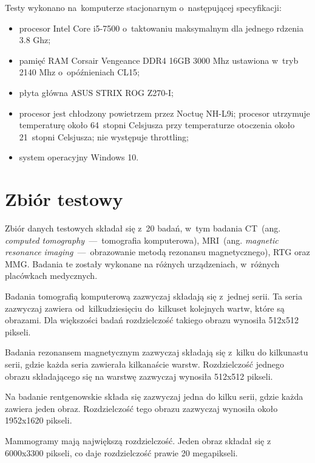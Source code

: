 \documentclass[a4paper,11pt,twoside,openright]{report}
\theoremstyle{definition}
\begin{document}
Testy wykonano na~komputerze stacjonarnym o~następującej specyfikacji:
\begin{itemize}[noitemsep]
\item procesor Intel Core i5-7500 o~taktowaniu maksymalnym dla jednego rdzenia 3.8 Ghz;
\item pamięć RAM Corsair Vengeance DDR4 16GB 3000 Mhz ustawiona w~tryb 2140 Mhz o~opóźnieniach CL15;
\item płyta główna ASUS STRIX ROG Z270-I;
\item procesor jest chłodzony powietrzem przez Noctuę NH-L9i; procesor utrzymuje
temperaturę około 64~stopni Celsjusza przy temperaturze otoczenia około 21~stopni
Celsjusza; nie występuje throttling;
\item system operacyjny Windows 10.
\end{itemize}

\section {Zbiór testowy}

Zbiór danych testowych składał się z~20 badań, w~tym badania 
CT~(ang. \textit{computed tomography}~---~tomografia komputerowa), 
MRI~(ang. \textit{magnetic resonance imaging}~---~obrazowanie metodą rezonansu magnetycznego),
RTG oraz MMG. Badania te zostały wykonane na różnych urządzeniach, w~różnych placówkach medycznych.

Badania tomografią komputerową zazwyczaj składają się z~jednej serii. Ta seria zazwyczaj zawiera od~kilkudziesięciu
do~kilkuset kolejnych wartw, które są obrazami. Dla większości badań rozdzielczość takiego obrazu wynosiła 512x512 pikseli.

Badania rezonansem magnetycznym zazwyczaj składają się z~kilku do kilkunastu serii, gdzie każda seria zawierała kilkanaście warstw.
Rozdzielczość jednego obrazu składającego się na warstwę zazwyczaj wynosiła 512x512 pikseli.

Na badanie rentgenowskie składa się zazwyczaj jedna do kilku serii, gdzie każda zawiera jeden obraz. Rozdzielczość tego obrazu zazwyczaj wynosiła około 1952x1620 pikseli.

Mammogramy mają największą rozdzielczość. Jeden obraz składał się z 6000x3300 pikseli, co daje rozdzielczość prawie 20 megapikseli.

\end{document}
